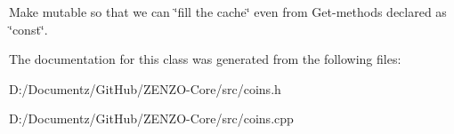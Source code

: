 Make mutable so that we can \char`\"{}fill the cache\char`\"{} even from Get-\/methods declared as \char`\"{}const\char`\"{}. 

The documentation for this class was generated from the following files\+:\begin{DoxyCompactItemize}
\item 
D\+:/\+Documentz/\+Git\+Hub/\+Z\+E\+N\+Z\+O-\/\+Core/src/coins.\+h\item 
D\+:/\+Documentz/\+Git\+Hub/\+Z\+E\+N\+Z\+O-\/\+Core/src/coins.\+cpp\end{DoxyCompactItemize}
